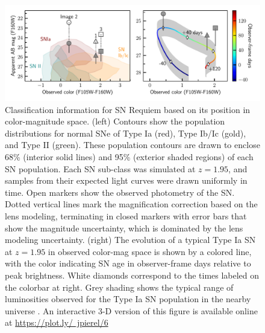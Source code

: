 \documentclass[12pt,dvipsnames]{article}
\begin{document}
\clearpage
\begin{figure}[h]
    \centering
    \includegraphics[draft=False, width=\textwidth]{Paper/Figures/classification_contours_timeline.pdf}
    \caption{Classification information for SN Requiem based on its position in color-magnitude space. (left) Contours show the population distributions for normal SNe of Type Ia (red), Type Ib/Ic (gold), and Type II (green).  These population contours are drawn to enclose 68\% (interior solid lines) and 95\% (exterior shaded regions) of each SN population.  Each SN sub-class was simulated at $z=1.95$, and samples from their expected light curves were drawn uniformly in time. Open markers show the observed photometry of the SN. Dotted vertical lines mark the magnification correction based on the lens modeling, terminating in closed markers with error bars that show the magnitude uncertainty, which is dominated by the lens modeling uncertainty.  (right) The evolution of a typical Type Ia SN at $z=1.95$ in observed color-mag space is shown by a colored line, with the color indicating SN age in observer-frame days relative to peak brightness.  White diamonds correspond to the times labeled on the colorbar at right. Grey shading shows the typical range of luminosities observed for the Type Ia SN population in the nearby universe \cite{wang_determination_2006}. An interactive 3-D version of this figure is available online at \href{https://plot.ly/~jpierel/6}{https://plot.ly/~jpierel/6}
    \label{fig:class}
    }
\end{figure}
\end{document}
